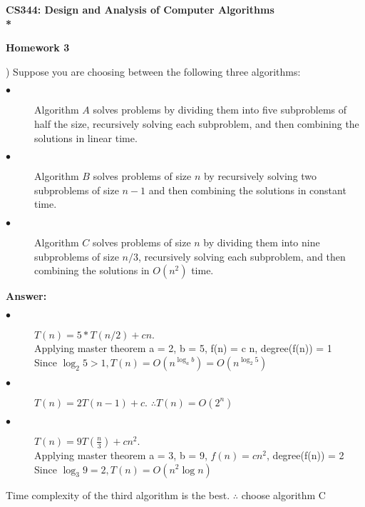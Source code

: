 \documentclass{article}
\begin{document}
\begin{center}
\bf{\LARGE CS344: Design and Analysis of Computer Algorithms} \\*

\vspace{0.2in}
{\bf {\Large Homework 3}}
\end{center}

\vspace{.2in}


\vspace{.2in}
) Suppose you are choosing between the following three algorithms: \\
\begin{description}
	\item[$\bullet$] Algorithm $A$ solves problems by dividing them into five subproblems of half 	the size, recursively solving each subproblem, and then combining the solutions in linear time.
	\item[$\bullet$] Algorithm $B$ solves problems of size $n$ by recursively solving two subproblems of size $n - 1$ and then combining the solutions in constant time.
	\item[$\bullet$] Algorithm $C$ solves problems of size $n$ by dividing them into nine subproblems of size $n/3$, recursively solving each subproblem, and then combining the solutions in $O(n^2)$ time.
\end{description}
\vspace{.1in}
{\bf Answer:} \\
\begin{description}
	\item[$\bullet$] $T(n) = 5 * T(n/2) + c n$. \\
	Applying master theorem a = 2, b = 5, f(n) = c n, degree(f(n)) = 1 \\
	Since $\log_2 5 > 1, T(n) = O(n^{\log_a b}) = O(n^{\log_2 5})$
	\item[$\bullet$] $T(n) = 2T(n - 1) + c$. $\therefore T(n) = O(2^n)$
	\item[$\bullet$] $T(n) = 9T(\frac{n}{3}) + cn^2$. \\
	Applying master theorem a = 3, b = 9, $f(n) = c n^2$, degree(f(n)) = 2 \\
	Since $\log_3 9 = 2, T(n) = O(n^2 \log n)$
\end{description}
\indent Time complexity of the third algorithm is the best. $\therefore$ choose algorithm C 
 
\end{document}
